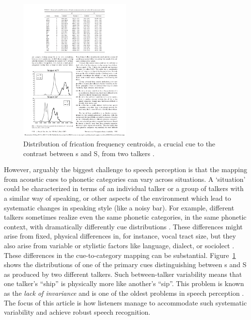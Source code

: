 \begin{figure}[htb]
  \centering
  \includegraphics[width=0.5\textwidth] {newman-clouse-burnham-2001-fig2-categorical-mismatch.pdf}
  \caption[Distribution of frication frequency centroids, a crucial cue to the contrast between \ph s and \ph S, from two talkers \protect\autocite{Newman2001}]{Distribution of frication frequency centroids, a crucial cue to the contrast between \ph s and \ph S, from two talkers \protect\autocite[reproduced with permission from][copyright 2001 Acoustical Society of America]{Newman2001}.}
  \label{fig:newman-et-al-fricative-centroids}
\end{figure}

\label{r3-environment-situation}
However, arguably the biggest challenge to speech perception is that the mapping from acoustic cues to phonetic categories can vary across situations. A `situation' could be characterized in terms of an individual talker or a group of talkers with a similar way of speaking, or other aspects of the environment which lead to systematic changes in speaking style (like a noisy bar). For example, different talkers sometimes realize even the same phonetic categories, in the same phonetic context, with dramatically differently cue distributions \autocite[e.g.,][]{Allen2003,McMurray2011a,Newman2001}.  These differences might arise from fixed, physical differences in, for instance, vocal tract size, but they also arise from variable or stylistic factors like language, dialect, or sociolect \autocite[e.g.,][]{Babel2014,Johnson2006,Labov1972,Pierrehumbert2003}.  These differences in the cue-to-category mapping can be substantial.
Figure~\ref{fig:newman-et-al-fricative-centroids} shows the distributions of one of the primary cues distinguishing between \ph s and \ph S as produced by two different talkers.  Such between-talker variability means that one talker's ``ship'' is physically more like another's ``sip''.
This problem is known as the \emph{lack of invariance} and is one of the oldest problems in speech perception \autocite{Liberman1967}.
The focus of this article is how listeners manage to accommodate such systematic variability and achieve robust speech recognition.

